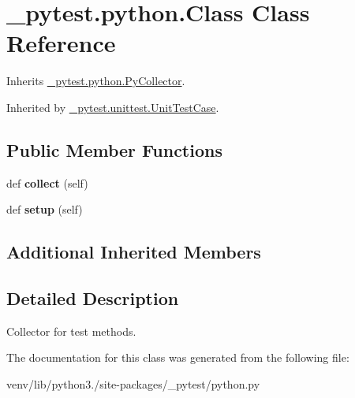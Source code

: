 \hypertarget{class__pytest_1_1python_1_1_class}{}\section{\+\_\+pytest.\+python.\+Class Class Reference}
\label{class__pytest_1_1python_1_1_class}


Inherits \hyperlink{class__pytest_1_1python_1_1_py_collector}{\+\_\+pytest.\+python.\+Py\+Collector}.



Inherited by \hyperlink{class__pytest_1_1unittest_1_1_unit_test_case}{\+\_\+pytest.\+unittest.\+Unit\+Test\+Case}.

\subsection*{Public Member Functions}
\begin{DoxyCompactItemize}
\item 
\mbox{\label{class__pytest_1_1python_1_1_class_a86e259aedabe22ef7240690ef42e2ccb}} 
def {\bfseries collect} (self)
\item 
\mbox{\label{class__pytest_1_1python_1_1_class_a31f47fd33252b2d298270d825a62cf2a}} 
def {\bfseries setup} (self)
\end{DoxyCompactItemize}
\subsection*{Additional Inherited Members}


\subsection{Detailed Description}
\begin{DoxyVerb}Collector for test methods. \end{DoxyVerb}
 

The documentation for this class was generated from the following file\+:\begin{DoxyCompactItemize}
\item 
venv/lib/python3./site-\/packages/\+\_\+pytest/python.\+py\end{DoxyCompactItemize}
